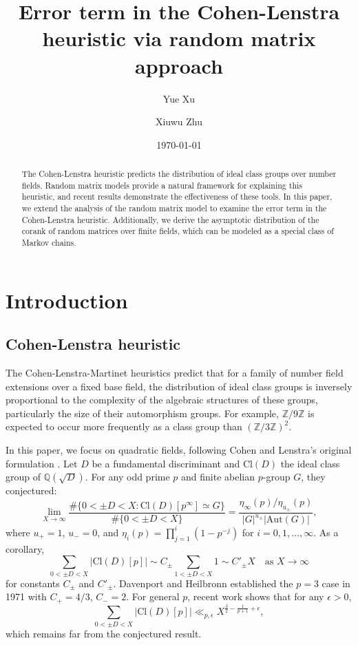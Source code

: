 \documentclass[a4]{amsart}
\title{Error term in the Cohen-Lenstra heuristic via random matrix approach}
\author{Yue Xu}
\author{Xiuwu Zhu}
\date{\today}
\newcommand{\Aut}{{\mathrm{Aut}}}
\newcommand{\Cl}{\mathrm{Cl}}
\newcommand{\BQ}{{\mathbb {Q}}}
\newcommand{\BZ}{{\mathbb {Z}}}
\theoremstyle{remark} \newtheorem{remark}[theorem]{Remark}
\begin{document}
\begin{abstract}
The Cohen-Lenstra heuristic predicts the distribution of ideal class groups over number fields. Random matrix models provide a natural framework for explaining this heuristic, and recent results demonstrate the effectiveness of these tools. In this paper, we extend the analysis of the random matrix model to examine the error term in the Cohen-Lenstra heuristic. Additionally, we derive the asymptotic distribution of the corank of random matrices over finite fields, which can be modeled as a special class of Markov chains.
\end{abstract}
\maketitle

\section{Introduction}
\subsection{Cohen-Lenstra heuristic}
The Cohen-Lenstra-Martinet heuristics \cite{martinet1990Étude, wang2021Moments} predict that for a family of number field extensions over a fixed base field, the distribution of ideal class groups is inversely proportional to the complexity of the algebraic structures of these groups, particularly the size of their automorphism groups. 
For example, $\BZ/9\BZ$ is expected to occur more frequently as a class group than $(\BZ/3\BZ)^2$.

In this paper, we focus on quadratic fields, following Cohen and Lenstra's original formulation \cite{cohen1984Heuristics}. 
Let $D$ be a fundamental discriminant and $\Cl(D)$ the ideal class group of $\BQ(\sqrt{D})$. For any odd prime $p$ and finite abelian $p$-group $G$, they conjectured:
\[
\lim_{X\to \infty}\frac{\#\{0<\pm D<X: \Cl(D)[p^\infty]\simeq G\}}{\#\{0<\pm D<X\}} = \frac{\eta_\infty(p)/\eta_{u_\pm}(p)}{|G|^{u_\pm}|\Aut(G)|},
\]
where $u_+=1$, $u_-=0$, and $\eta_i(p)=\prod_{j=1}^{i}(1-p^{-j})$ for $i=0,1,\dots,\infty$.
As a corollary,
\[
\sum_{0<\pm D<X}|\Cl(D)[p]|\sim C_\pm\sum_{1<\pm D<X}1\sim C'_{\pm}X \quad \text{as }X\to \infty
\]
for constants $C_\pm$ and $C'_\pm$. Davenport and Heilbronn \cite{davenport1971density} established the $p=3$ case in 1971 with $C_+=4/3$, $C_-=2$. For general $p$, recent work \cite[equation (1.14)]{koymans2024Bounds} shows that for any $\epsilon>0$,
\[
\sum_{0<\pm D<X}|\Cl(D)[p]|\ll_{p, \epsilon} X^{\frac{3}{2}-\frac{1}{p+1}+\epsilon},
\]
which remains far from the conjectured result.
\end{document}
